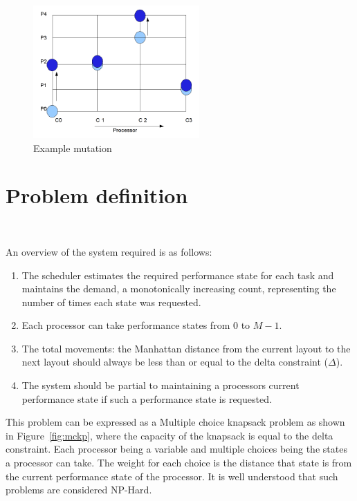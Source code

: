 \begin{figure}[h!]
  \begin{center}
    \includegraphics[height=2in]{figures/example_mutation_3.png}
    \caption{Example mutation}
    \label{fig:ex_mutation}
  \end{center}
\end{figure}



\section{Problem definition}~\label{sec:ago}

An overview of the system required is as follows:
\begin{enumerate}
\item The scheduler estimates the required performance state for each task and maintains the demand, 
a monotonically increasing count, representing the number of times each state was requested. 
\item Each processor can take performance states from $0$ to $M-1$. 
\item The total movements: the Manhattan distance from the current layout to the next layout 
should always be less than or equal to the delta constraint ($\Delta$). 
\item The system should be partial to maintaining a processors current performance state if such a performance state is requested.
\end{enumerate}

This problem can be expressed as a Multiple choice knapsack problem as shown in Figure~\ref{fig:mckp}, where the capacity of the knapsack 
is equal to the delta constraint. Each processor being a variable and multiple choices being the states 
a processor can take. The weight for each choice is the distance that state is from the current 
performance state of the processor. It is well understood that such problems are considered NP-Hard.

